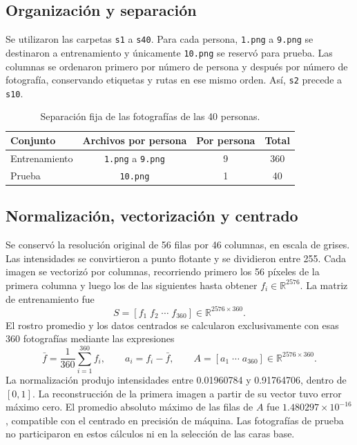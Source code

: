 \documentclass[11pt,a4paper]{article}
\newcommand{\archivo}[1]{\texttt{#1}}
\newcommand{\cientifico}[2]{\ensuremath{#1\times10^{#2}}}
\begin{document}
\subsection{Organización y separación}
Se utilizaron las carpetas \archivo{s1} a \archivo{s40}. Para cada persona,
\archivo{1.png} a \archivo{9.png} se destinaron a entrenamiento y únicamente
\archivo{10.png} se reservó para prueba. Las columnas se ordenaron primero por
número de persona y después por número de fotografía, conservando etiquetas y rutas
en ese mismo orden. Así, \archivo{s2} precede a \archivo{s10}.

\begin{table}[h]
\centering
\caption{Separación fija de las fotografías de las 40 personas.}
\begin{tabular}{lccc}
\toprule
Conjunto & Archivos por persona & Por persona & Total\\
\midrule
Entrenamiento & \archivo{1.png} a \archivo{9.png} & 9 & 360\\
Prueba & \archivo{10.png} & 1 & 40\\
\bottomrule
\end{tabular}
\end{table}

\subsection{Normalización, vectorización y centrado}
Se conservó la resolución original de 56 filas por 46 columnas, en escala de grises.
Las intensidades se convirtieron a punto flotante y se dividieron entre 255.
Cada imagen se vectorizó por columnas, recorriendo primero los 56 píxeles de la
primera columna y luego los de las siguientes hasta obtener $f_i\in\mathbb{R}^{2576}$.
La matriz de entrenamiento fue
\begin{equation}
S=[f_1\;f_2\;\cdots\;f_{360}]\in\mathbb{R}^{2576\times360}.
\end{equation}
El rostro promedio y los datos centrados se calcularon exclusivamente con esas
360 fotografías mediante las expresiones
\begin{equation}
\bar f=\frac{1}{360}\sum_{i=1}^{360}f_i,
\qquad a_i=f_i-\bar f,
\qquad A=[a_1\;\cdots\;a_{360}]\in\mathbb{R}^{2576\times360}.
\end{equation}
La normalización produjo intensidades entre 0.01960784 y 0.91764706, dentro de
$[0,1]$. La reconstrucción de la primera imagen a partir de su vector tuvo error
máximo cero. El promedio absoluto máximo de las filas de $A$ fue
\cientifico{1.480297}{-16}, compatible con el centrado en precisión de máquina.
Las fotografías de prueba no participaron en estos cálculos ni en la selección
de las caras base.
\end{document}
